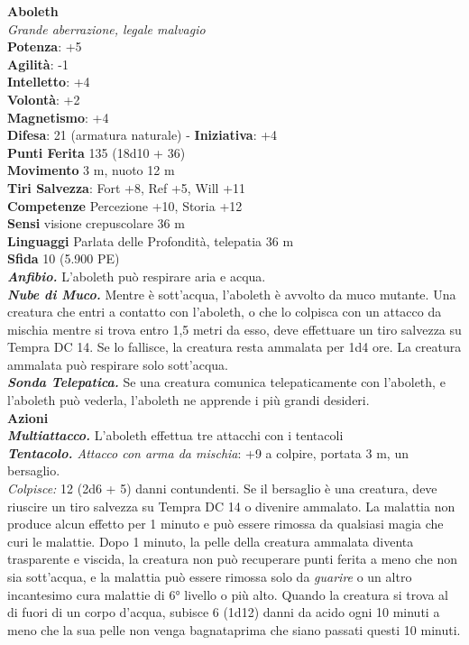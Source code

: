 \begin{multicols}{2}
\textbf{Aboleth}\\
\emph{Grande aberrazione, legale malvagio}\\
\textbf{Potenza}: +5\\
\textbf{Agilità}: -1\\
\textbf{Intelletto}: +4\\
\textbf{Volontà}: +2\\
\textbf{Magnetismo}: +4\\
\textbf{Difesa}: 21 (armatura naturale) - \textbf{Iniziativa}: +4\\
\textbf{Punti Ferita} 135 (18d10 + 36)\\
\textbf{Movimento} 3 m, nuoto 12 m\\
\textbf{Tiri Salvezza}: Fort +8, Ref +5, Will +11\\
\textbf{Competenze} Percezione +10, Storia +12\\
\textbf{Sensi} visione crepuscolare 36 m\\
\textbf{Linguaggi} Parlata delle Profondità, telepatia 36 m\\
\textbf{Sfida} 10 (5.900 PE)\\
\smallskip
\emph{\textbf{Anfibio.}} L'aboleth può respirare aria e acqua.\\
\emph{\textbf{Nube di Muco.}} Mentre è sott'acqua, l'aboleth è avvolto da muco mutante. Una creatura che entri a contatto con l'aboleth, o che lo colpisca con un attacco da mischia mentre si trova entro 1,5 metri da esso, deve effettuare un tiro salvezza su Tempra DC 14. Se lo fallisce, la creatura resta ammalata per 1d4 ore. La creatura ammalata può respirare solo sott'acqua.\\
\emph{\textbf{Sonda Telepatica.}} Se una creatura comunica telepaticamente con l'aboleth, e l'aboleth può vederla, l'aboleth ne apprende i più grandi desideri. \\
\textbf{Azioni}\\
\emph{\textbf{Multiattacco.}} L'aboleth effettua tre attacchi con i tentacoli\\
\emph{\textbf{Tentacolo.} Attacco con arma da mischia}: +9 a colpire, portata 3 m, un bersaglio.\\
\emph{Colpisce:} 12 (2d6 + 5) danni contundenti. Se il bersaglio è una creatura, deve riuscire un tiro salvezza su Tempra DC 14 o divenire ammalato. La malattia non produce alcun effetto per 1 minuto e può essere rimossa da qualsiasi magia che curi le malattie. Dopo 1 minuto, la pelle della creatura ammalata diventa trasparente e viscida, la creatura non può recuperare punti ferita a meno che non sia sott'acqua, e la malattia può essere rimossa solo da \emph{guarire} o un altro incantesimo cura malattie di 6° livello o più alto. Quando la creatura si trova al di fuori di un corpo d'acqua, subisce 6 (1d12) danni da acido ogni 10 minuti a meno che la sua pelle non venga bagnataprima che siano  passati questi 10 minuti. \\

\end{multicols}
